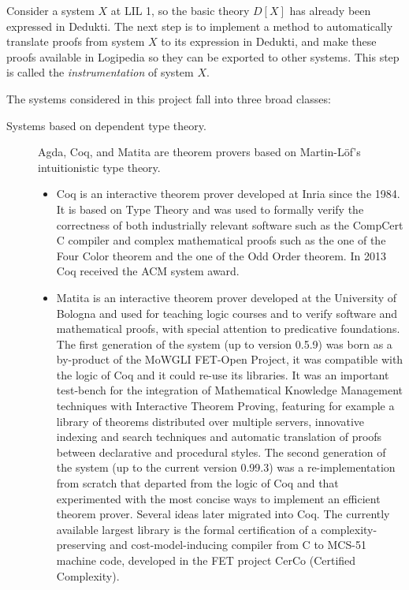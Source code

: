 Consider a system $X$ at LIL 1, so the basic theory $D[X]$ has
already been expressed in Dedukti. The next step is to implement a
method to automatically translate proofs from system $X$ to its
expression in Dedukti, and make these proofs available in Logipedia so
they can be exported to other systems. This step is called the
\emph{instrumentation} of system $X$.

The systems considered in this project fall into three broad classes:
\begin{description}

  \item[Systems based on dependent type theory.] Agda, Coq, and Matita
  are theorem provers based on Martin-L\"of's intuitionistic type
  theory.

  \begin{itemize}
    \item Coq is an interactive theorem prover developed at Inria
    since the 1984.  It is based on Type Theory and was used to
    formally verify the correctness of both industrially relevant
    software such as the CompCert C compiler and complex mathematical
    proofs such as the one of the Four Color theorem and the one of
    the Odd Order theorem. In 2013 Coq received the ACM system award.

    \item Matita is an interactive theorem prover developed at the
    University of Bologna and used for teaching logic courses and to
    verify software and mathematical proofs, with special attention to
    predicative foundations. The first generation of the system (up to
    version 0.5.9) was born as a by-product of the MoWGLI FET-Open
    Project, it was compatible with the logic of Coq and it could
    re-use its libraries. It was an important test-bench for the
    integration of Mathematical Knowledge Management techniques with
    Interactive Theorem Proving, featuring for example a library of
    theorems distributed over multiple servers, innovative indexing
    and search techniques and automatic translation of proofs between
    declarative and procedural styles. The second generation of the
    system (up to the current version 0.99.3) was a re-implementation
    from scratch that departed from the logic of Coq and that
    experimented with the most concise ways to implement an efficient
    theorem prover. Several ideas later migrated into Coq. The
    currently available largest library is the formal certification of
    a complexity-preserving and cost-model-inducing compiler from C to
    MCS-51 machine code, developed in the FET project CerCo (Certified
    Complexity).


\end{itemize}
\end{description}
